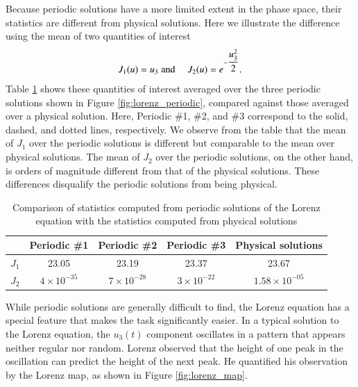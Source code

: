 \documentclass[preprint,12pt]{elsarticle}
\begin{document}
Because periodic solutions have a more limited extent in the phase space, their
statistics are different from physical solutions.
Here we illustrate the difference using the mean of two
quantities of interest
\begin{align}
		J_1(u) = u_3\;{\rm and}\;\quad J_2(u) = e^{-\dfrac{u_3^2}2}.
\end{align}
Table \ref{tab:lorenz_periodic_stats} shows these quantities
of interest averaged over the three periodic solutions shown in Figure
\ref{fig:lorenz_periodic}, compared against those averaged over a
physical solution.  Here, Periodic \#1, \#2, and \#3 correspond to
the solid, dashed, and dotted lines, respectively.
We observe from the table that the mean of $J_1$ over the periodic
solutions is different but comparable to the mean over physical solutions.  The mean of $J_2$ over the periodic solutions, on the other hand,
is orders of magnitude different from that of the physical solutions.
These differences disqualify the periodic solutions from being physical.
\begin{table}[H]
    \centering
    \begin{tabular}{c|c|c|c|c}
             & Periodic \#1 & Periodic \#2
             & Periodic \#3 & Physical solutions \\
    \hline
        $J_1$& 23.05 &
               23.19 &
               23.37 &
               23.67 \\
        $J_2$&$4\times 10^{-35}$&
              $7\times 10^{-28}$&
              $3\times 10^{-22}$&
              $1.58\times 10^{-05}$
    \end{tabular}
    \caption{Comparison of statistics computed from periodic solutions of the Lorenz equation with the statistics computed from physical solutions}
    \label{tab:lorenz_periodic_stats}
\end{table}

While periodic solutions are generally difficult to find,
the Lorenz equation has a special feature that makes the task significantly
easier.  In a typical solution to the Lorenz equation, the 
$u_3(t)$ component oscillates in a pattern that appears neither regular nor random.  Lorenz
observed that the height of one peak in the oscillation can predict the height of the next peak.  He quantified his observation by the Lorenz map,
as shown in Figure \ref{fig:lorenz_map}.
\end{document}
